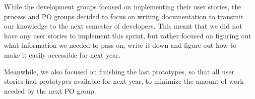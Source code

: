 While the development groups focused on implementing their user stories, the process and PO groups decided to focus on writing documentation to transmit our knowledge to the next semester of developers.
This meant that we did not have any user stories to implement this sprint, but rather focused on figuring out what information we needed to pass on, write it down and figure out how to make it easily accessible for next year.

Meanwhile, we also focused on finishing the last prototypes, so that all user stories had prototypes available for next year, to minimize the amount of work needed by the next PO group.
